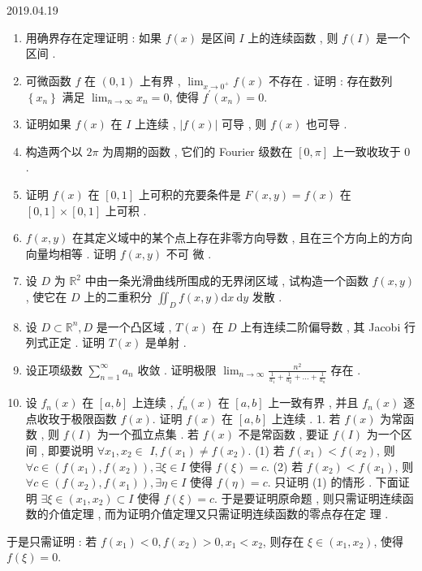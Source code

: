 \documentclass[10pt]{article}
\begin{document}
2019.04.19

\begin{enumerate}
  \item  用确界存在定理证明 :  如果  $f(x)$  是区间  $I$  上的连续函数 ,  则  $f(I)$  是一个区间 .

  \item  可微函数  $f$  在  $(0,1)$  上有界 , $\lim _{x \rightarrow 0^{+}} f(x)$  不存在 .  证明 :  存在数列  $\left\{x_{n}\right\}$  满足  $\lim _{n \rightarrow \infty} x_{n}=0$,  使得  $f^{\prime}\left(x_{n}\right)=0$.

  \item  证明如果  $f(x)$  在  $I$  上连续 , $|f(x)|$  可导 ,  则  $f(x)$  也可导 .

  \item  构造两个以  $2 \pi$  为周期的函数 ,  它们的  Fourier  级数在  $[0, \pi]$  上一致收玫于  0 .

  \item  证明  $f(x)$  在  $[0,1]$  上可积的充要条件是  $F(x, y)=f(x)$  在  $[0,1] \times[0,1]$  上可积 .

  \item $f(x, y)$  在其定义域中的某个点上存在非零方向导数 ,  且在三个方向上的方向向量均相等 .  证明  $f(x, y)$  不可   微 .

  \item  设  $D$  为  $\mathbb{R}^{2}$  中由一条光滑曲线所围成的无界闭区域 ,  试构造一个函数  $f(x, y)$,  使它在  $D$  上的二重积分  $\iint_{D} f(x, y) \mathrm{d} x \mathrm{~d} y$  发散 .

  \item  设  $D \subset \mathbb{R}^{n}, D$  是一个凸区域 , $T(x)$  在  $D$  上有连续二阶偏导数 ,  其  Jacobi  行列式正定 .  证明  $T(x)$  是单射 .

  \item  设正项级数  $\sum_{n=1}^{\infty} a_{n}$  收敛 .  证明极限  $\lim _{n \rightarrow \infty} \frac{n^{2}}{\frac{1}{a_{1}}+\frac{1}{a_{2}}+\ldots+\frac{1}{a_{n}}}$  存在 .

  \item  设  $f_{n}(x)$  在  $[a, b]$  上连续 , $f_{n}^{\prime}(x)$  在  $[a, b]$  上一致有界 ,  并且  $f_{n}(x)$  逐点收玫于极限函数  $f(x)$.  证明  $f(x)$  在  $[a, b]$  上连续 . 1.  若  $f(x)$  为常函数 ,  则  $f(I)$  为一个孤立点集 .  若  $f(x)$  不是常函数 ,  要证  $f(I)$  为一个区间 ,  即要说明  $\forall x_{1}, x_{2} \in$ $I, f\left(x_{1}\right) \neq f\left(x_{2}\right)$. (1) 若  $f\left(x_{1}\right)<f\left(x_{2}\right)$,  则  $\forall c \in\left(f\left(x_{1}\right), f\left(x_{2}\right)\right), \exists \xi \in I$  使得  $f(\xi)=c$. (2)  若  $f\left(x_{2}\right)<f\left(x_{1}\right)$,  则  $\forall c \in\left(f\left(x_{2}\right), f\left(x_{1}\right)\right), \exists \eta \in I$  使得  $f(\eta)=c$.  只证明 (1) 的情形 .  下面证明  $\exists \xi \in\left(x_{1}, x_{2}\right) \subset I$  使得  $f(\xi)=c$.  于是要证明原命题 ,  则只需证明连续函数的介值定理 ,  而为证明介值定理又只需证明连续函数的零点存在定   理 .

\end{enumerate}
 于是只需证明 :  若  $f\left(x_{1}\right)<0, f\left(x_{2}\right)>0, x_{1}<x_{2}$,  则存在  $\xi \in\left(x_{1}, x_{2}\right)$,  使得  $f(\xi)=0$.
\end{document}
